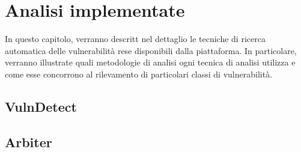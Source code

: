 \documentclass[../main.tex]{subfiles}
\begin{document}
\chapter{Analisi implementate}
In questo capitolo, verranno descritt nel dettaglio le tecniche di ricerca automatica delle vulnerabilità rese disponibili dalla piattaforma.
In particolare, verranno illustrate quali metodologie di analisi ogni tecnica di analisi utilizza e come esse concorrono al rilevamento
di particolari classi di vulnerabilità.

\section{VulnDetect}

\section{Arbiter}
\end{document}
